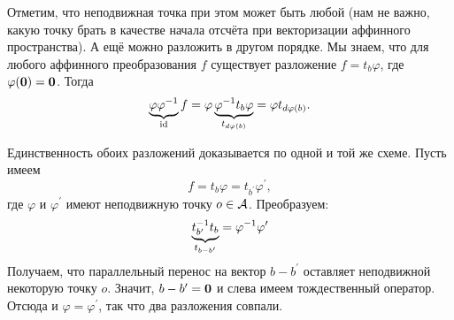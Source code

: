 Отметим, что неподвижная точка при этом может быть любой (нам не важно, какую точку брать в качестве начала отсчёта при векторизации аффинного пространства). А ещё можно разложить в другом порядке. Мы знаем, что для любого аффинного преобразования $f$ существует разложение $f = t_b\varphi$, где $\varphi(\boldsymbol{0}) = \boldsymbol{0}$. Тогда
\[
    \underbrace{\varphi\varphi^{-1}}_{\mathrm{id}}f = \varphi\underbrace{\varphi^{-1}t_b\varphi}_{t_{d\varphi(b)}} = \varphi t_{d\varphi(b)}.
\]

Единственность обоих разложений доказывается по одной и той же схеме. Пусть имеем
\[
    f = t_b\varphi = t_{b^\prime}\varphi^\prime,
\]
где $\varphi$ и $\varphi^\prime$ имеют неподвижную точку $o \in \mathcal{A}$. Преобразуем:
\[
    \underbrace{t^{-1}_{b^\prime}t_b}_{t_{b - b^\prime}} = \varphi^{-1}\varphi^\prime\\
\]
Получаем, что параллельный перенос на вектор $b - b^\prime$ оставляет неподвижной некоторую точку $o$. Значит, $b - b^\prime = \boldsymbol{0}$ и слева имеем тождественный оператор. Отсюда и $\varphi = \varphi^\prime$, так что два разложения совпали.

